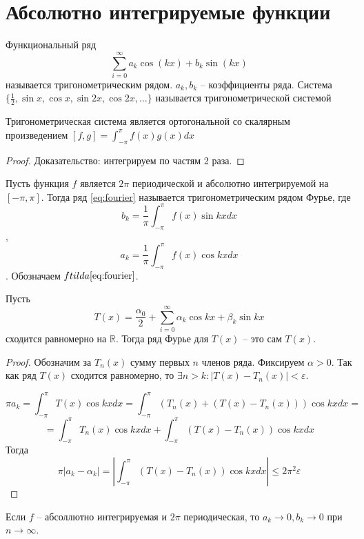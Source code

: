 \documentclass[document.tex]{subfiles}
\begin{document}
\section{Абсолютно интегрируемые функции}
\begin{definition}
	Функциональный ряд 
	\begin{equation}
		\label{eq:fourier}
		\sum_{i=0}^{\infty} a_k \cos(kx) + b_k \sin(kx)
	\end{equation} называется тригонометрическим рядом. $a_k, b_k$ -- коэффициенты ряда.
	Система $\{\frac{1}{2}, \sin x, \cos x, \sin 2x, \cos 2x, \ldots\}$ называется тригонометрической системой
\end{definition}

\begin{statement}
	Тригонометрическая система является ортогональной со скалярным произведением $[f, g] = \int_{-\pi}^{\pi}f(x)g(x)dx$
\end{statement}
\begin{proof}
	Доказательство: интегрируем по частям 2 раза.
\end{proof}

\begin{definition}
	Пусть функция $f$ является $2 \pi$ периодической и абсолютно интегрируемой на $[-\pi, \pi]$. Тогда ряд \ref{eq:fourier} называется
	тригонометрическим рядом Фурье, где $$b_k = \frac{1}{\pi}\int_{-\pi}^{\pi}f(x) \sin kx dx$$, 
	$$a_k = \frac{1}{\pi}\int_{-\pi}^{\pi}f(x) \cos kx dx$$.
	Обозначаем $f tilda \text{\ref{eq:fourier}}$.
\end{definition}

\begin{statement}
	Пусть $$T(x) = \frac{\alpha_0}{2} + \sum_{i=0}^{\infty} \alpha_k \cos kx + \beta_k \sin kx$$ сходится равномерно на $\mathbb{R}$. Тогда ряд Фурье для $T(x)$ -- это сам $T(x)$.
\end{statement}
\begin{proof}
	Обозначим за $T_n(x)$ сумму первых $n$ членов ряда.
	Фиксируем $\alpha > 0$. Так как ряд $T(x)$ сходится равномерно, то $\exists n > k: |T(x) - T_n(x)| < \varepsilon$.

	$$\pi a_k = \int_{-\pi}^{\pi} T(x)\cos kx dx = \int_{-\pi}^{\pi} (T_n(x) + (T(x) - T_n(x))) \cos kx dx = $$
	$$= \int_{-\pi}^{\pi} T_n(x) \cos kx dx + \int_{-\pi}^{\pi} (T(x) - T_n(x)) \cos kx dx$$
	Тогда $$\pi |a_k - \alpha_k| = |\int_{-\pi}^{\pi}(T(x) - T_n(x)) \cos kx dx| \leq 2 \pi^2 \varepsilon$$
\end{proof}
\begin{corollary}
	Если $f$ -- абсоллютно интегрируемая и $2 \pi$ периодическая, то $a_k \rightarrow 0, b_k \rightarrow 0$ при $n \rightarrow \infty$.
\end{corollary}
\end{document}
